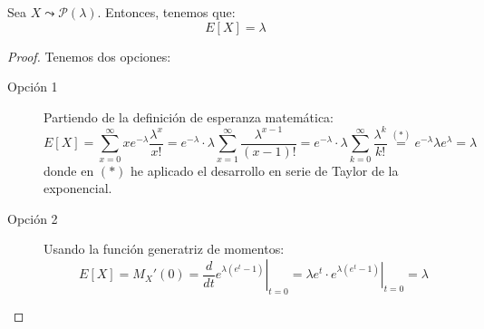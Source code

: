 \begin{prop}
    Sea $X\leadsto \mathcal{P}(\lambda)$. Entonces, tenemos que:
    \begin{equation*}
        E[X]= \lambda
    \end{equation*}
\end{prop}
\begin{proof} 
    Tenemos dos opciones:
    \begin{description}
        \item[Opción 1]  Partiendo de la definición de esperanza matemática:
        \begin{equation*}
            E[X]=\sum_{x=0}^\infty xe^{-\lambda}\frac{\lambda^x}{x!}
            = e^{-\lambda}\cdot \lambda \sum_{x=1}^\infty \frac{\lambda^{x-1}}{(x-1)!}
            = e^{-\lambda}\cdot \lambda \sum_{k=0}^\infty \frac{\lambda^k}{k!}
            \stackrel{(\ast)}{=} e^{-\lambda}\lambda e^{\lambda}=\lambda
        \end{equation*}
        donde en $(\ast)$ he aplicado el desarrollo en serie de Taylor de la exponencial.

        \item[Opción 2] Usando la función generatriz de momentos:
        \begin{equation*}
            E[X]=M_X'(0)=\left. \frac{d}{dt} e^{\lambda(e^t-1)}\right|_{t=0} = \left. \lambda e^t \cdot e^{\lambda(e^t-1)}\right|_{t=0} = \lambda
        \end{equation*}
    \end{description}
\end{proof}

